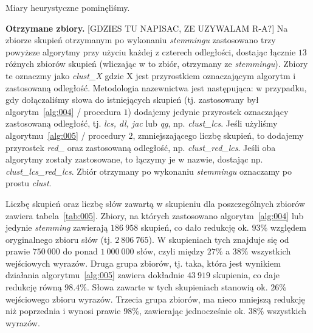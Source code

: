 \documentclass{praca1}
\begin{document}
Miary heurystyczne pominęliśmy.

\textbf{Otrzymane zbiory.} [GDZIES TU NAPISAC, ZE UZYWALAM R-A?] Na zbiorze skupień otrzymanym po wykonaniu \emph{stemmingu} zastosowano trzy powyższe algorytmy przy użyciu każdej z czterech odległości, dostając łącznie $13$ różnych zbiorów skupień (wliczając w to zbiór, otrzymany ze \emph{stemmingu}). Zbiory te oznaczmy jako \emph{clust\_X} gdzie X jest przyrostkiem oznaczającym algorytm i zastosowaną odległość. Metodologia nazewnictwa jest następująca: w przypadku, gdy dołączaliśmy słowa do istniejących skupień (tj. zastosowany był algorytm~\ref{alg:004} / procedura $1$) dodajemy jedynie przyrostek oznaczający zastosowaną odległość, tj. \emph{lcs, dl, jac} lub \emph{qg}, np. \emph{clust\_lcs}. Jeśli użyliśmy algorytmu~\ref{alg:005} / procedury $2$, zmniejszającego liczbę skupień, to dodajemy przyrostek \emph{red\_} oraz zastosowaną odległość, np. \emph{clust\_red\_lcs}. Jeśli oba algorytmy zostały zastosowane, to łączymy je w nazwie, dostając np. \emph{clust\_lcs\_red\_lcs}. Zbiór otrzymany po wykonaniu \emph{stemmingu} oznaczamy po prostu \emph{clust}. 


Liczbę skupień oraz liczbę słów zawartą w skupieniu dla poszczególnych zbiorów zawiera tabela~\ref{tab:005}. Zbiory, na których zastosowano algorytm~\ref{alg:004} lub jedynie \emph{stemming} zawierają $186\ 958$ skupień, co dało redukcję ok. $93\%$ względem oryginalnego zbioru słów (tj. $2\ 806\ 765$). W skupieniach tych znajduje się od  prawie $750\ 000$ do ponad $1\ 000\ 000$ słów, czyli między $27\%$ a $38\%$ wszystkich wejściowych wyrazów. Druga grupa zbiorów, tj. taka, która jest wynikiem działania algorytmu~\ref{alg:005} zawiera dokładnie $43\ 919$ skupienia, co daje redukcję równą $98.4\%$. Słowa zawarte w tych skupieniach stanowią ok. $26\%$ wejściowego zbioru wyrazów. Trzecia grupa zbiorów, ma nieco mniejszą redukcję niż poprzednia i wynosi prawie $98\%$, zawierając jednocześnie ok. $38\%$ wszystkich wyrazów.
\end{document}
